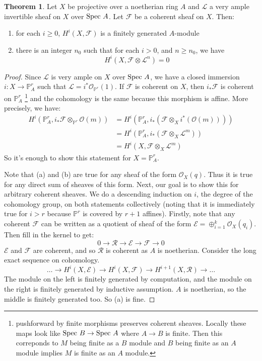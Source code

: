 \documentclass[10pt,reqno]{amsart}
\theoremstyle{definition}
\newtheorem{theorem}{Theorem}
\theoremstyle{remark}
\numberwithin{equation}{section}
\numberwithin{theorem}{section}
\newcommand{\OO}{{\mathcal O}}
\newcommand{\spec}{\textup{Spec }}
\newcommand{\FF}{{\mathscr F}}
\newcommand{\EE}{{\mathscr E}}
\newcommand{\RR}{{\mathscr R}}
\newcommand{\LL}{{\mathscr L}}
\newcommand{\PP}{{\mathbb P}}
\begin{document}
\begin{theorem} Let $X$ be projective over a noetherian ring $A$ and $\LL$ a very ample invertible sheaf on $X$ over $\spec A$. Let $\FF$ be a coherent sheaf on $X$. Then:
\begin{enumerate}
\item for each $i \ge 0$, $H^i(X,\FF)$ is a finitely generated $A$-module
\item there is an integer $n_0$ such that for each $i > 0$, and $n \ge n_0$, we have
\[H^i(X,\FF \otimes \LL^n) = 0\]
\end{enumerate}
\end{theorem}
\begin{proof}
Since $\LL$ is very ample on $X$ over $\spec A$, we have a closed immersion $i: X \to \PP^r_A$ such that $\LL = i^*\OO_{\PP^r}(1)$. If $\FF$ is coherent on $X$, then $i_* \FF$ is coherent on $\PP^r_A$ \footnote{pushforward by finite morphisms preserves coherent sheaves. Locally these maps look like $\spec B \to \spec A$ where $A \to B$ is finite. Then this correponds to $M$ being finite as a $B$ module and $B$ being finite as an $A$ module implies $M$ is finite as an $A$ module.} and the cohomology is the same because this morphism is affine. More precisely, we have:
\begin{align*}
H^i(\PP^r_A,i_* \FF \otimes_{\PP^r} \OO(m)) &= H^i(\PP^r_A, i_*(\FF \otimes_X i^*(\OO(m)))) \tag{projection formula (HW 2)}\\
&= H^i(\PP^r_A, i_*(\FF \otimes_X \LL^m))\\
&= H^i(X, \FF \otimes_X \LL^m) \tag{$i$ affine}
\end{align*}
So it's enough to show this statement for $X = \PP^r_A$.

Note that (a) and (b) are true for any sheaf of the form $\OO_X(q)$. Thus it is true for any direct sum of sheaves of this form. Next, our goal is to show this for arbitrary coherent sheaves. We do a descending induction on $i$, the degree of the cohomology group, on both statements collectively (noting that it is immediately true for $i  > r$ because $\PP^r$ is covered by $r+1$ affines). Firstly, note that any coherent $\FF$ can be written as a quotient of sheaf of the form $\EE = \oplus_{i=1}^k \OO_X(q_i)$. Then fill in the kernel to get:
\[0 \to \RR \to \EE \to \FF \to 0\]
$\EE$ and $\FF$ are coherent, and so $\RR$ is coherent as $A$ is noetherian. Consider the long exact sequence on cohomology.
\[\dots \to H^i(X,\EE) \to H^i(X,\FF) \to H^{i+1}(X,\RR) \to \dots\]
The module on the left is finitely generated by computation, and the module on the right is finitely generated by inductive assumption. $A$ is noetherian, so the middle is finitely generated too. So (a) is fine. 


\end{proof}
\end{document}

